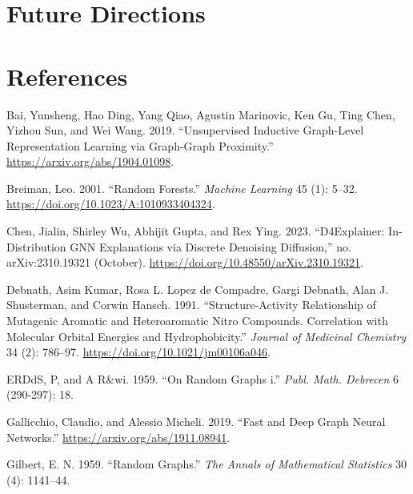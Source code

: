 \documentclass[
  11pt,
  letterpaper,
]{article}
\newlength{\cslhangindent}
\newlength{\cslentryspacingunit} %
\newenvironment{CSLReferences}[2] %
 {%
  \setlength{\parindent}{0pt}
  \ifodd #1
  \let\oldpar\par
  \def\par{\hangindent=\cslhangindent\oldpar}
  \fi
  \setlength{\parskip}{#2\cslentryspacingunit}
 }%
 {}
\begin{document}
\hypertarget{future-directions}{%
\section{Future Directions}\label{future-directions}}

\pagebreak

\hypertarget{references}{%
\section{References}\label{references}}

\hypertarget{refs}{}
\begin{CSLReferences}{1}{0}
\leavevmode{}%
Bai, Yunsheng, Hao Ding, Yang Qiao, Agustin Marinovic, Ken Gu, Ting
Chen, Yizhou Sun, and Wei Wang. 2019. {``Unsupervised Inductive
Graph-Level Representation Learning via Graph-Graph Proximity.''}
\url{https://arxiv.org/abs/1904.01098}.

\leavevmode{}%
Breiman, Leo. 2001. {``Random Forests.''} \emph{Machine Learning} 45
(1): 5--32. \url{https://doi.org/10.1023/A:1010933404324}.

\leavevmode{}%
Chen, Jialin, Shirley Wu, Abhijit Gupta, and Rex Ying. 2023.
{``D4Explainer: In-Distribution GNN Explanations via Discrete Denoising
Diffusion,''} no. arXiv:2310.19321 (October).
\url{https://doi.org/10.48550/arXiv.2310.19321}.

\leavevmode{}%
Debnath, Asim Kumar, Rosa L. Lopez de Compadre, Gargi Debnath, Alan J.
Shusterman, and Corwin Hansch. 1991. {``Structure-Activity Relationship
of Mutagenic Aromatic and Heteroaromatic Nitro Compounds. Correlation
with Molecular Orbital Energies and Hydrophobicity.''} \emph{Journal of
Medicinal Chemistry} 34 (2): 786--97.
\url{https://doi.org/10.1021/jm00106a046}.

\leavevmode{}%
ERDdS, P, and A R\&wi. 1959. {``On Random Graphs i.''} \emph{Publ. Math.
Debrecen} 6 (290-297): 18.

\leavevmode{}%
Gallicchio, Claudio, and Alessio Micheli. 2019. {``Fast and Deep Graph
Neural Networks.''} \url{https://arxiv.org/abs/1911.08941}.

\leavevmode{}%
Gilbert, E. N. 1959. {``Random Graphs.''} \emph{The Annals of
Mathematical Statistics} 30 (4): 1141--44.


\end{CSLReferences}
\end{document}
